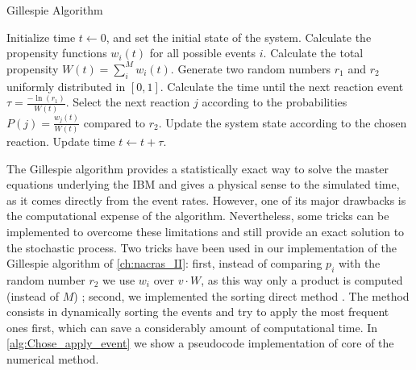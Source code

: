 \begin{algorithm}
  \caption{Gillespie Algorithm}
  \label{alg:gillespie}
  \begin{algorithmic}[1]
    \State Initialize time $t \gets 0$, and set the initial state of the
    system.
    \State Calculate the propensity functions $w_i(t)$ for all possible
    events $i$.
    \State Calculate the total propensity $W(t) = \sum_i^M w_i(t)$.
    \State Generate two random numbers $r_1$ and $r_2$ uniformly
    distributed in $[0,1]$.
    \State Calculate the time until the next reaction event $\tau =
      \frac{-\ln(r_1)}{W(t)}$.
    \State Select the next reaction $j$ according to the probabilities
    $P(j) = \frac{w_j(t)}{W(t)}$ compared to $r_2$.
    \State Update the system state according to the chosen reaction.
    \State Update time $t \gets t + \tau$.
    \EndWhile
  \end{algorithmic}
\end{algorithm}

The Gillespie algorithm provides a statistically exact way to solve the
master equations underlying the IBM and gives a physical sense to the simulated
time, as it comes directly from the event rates. However, one of its major
drawbacks is the computational expense of the algorithm. Nevertheless, some
tricks can be implemented to overcome these limitations and still provide an
exact solution to the stochastic process. Two tricks have been used in our
implementation of the Gillespie algorithm of \cref{ch:nacras_II}: first,
instead of comparing $p_i$ with the random number $r_2$ we use $w_i$ over
$v\cdot W$, as this way only a product is computed (instead of $M$)
\cite{Toral_master_eqs}; second, we implemented the sorting direct method
\cite{MCCOLLUM200639}. The method consists in dynamically sorting the events
and try to apply the most frequent ones first, which can save a considerably
amount of computational time. In \cref{alg:Chose_apply_event} we show a
pseudocode implementation of core of the numerical method.


